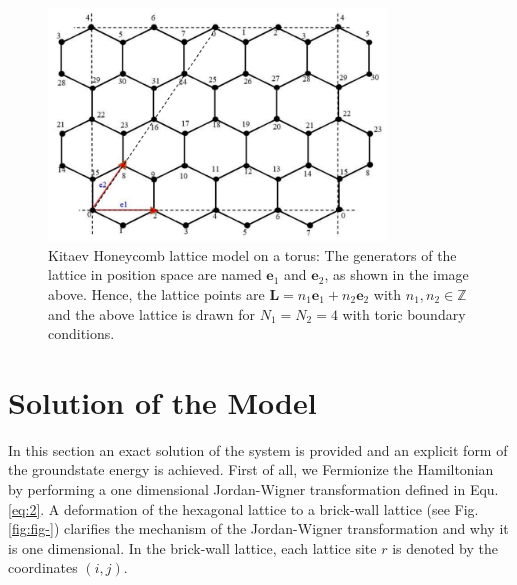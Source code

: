 \documentclass{article}
\begin{document}
\begin{figure}[h!]
	\centering
	\includegraphics[width=0.8\textwidth]{./images/diag_1.png}
	\caption{\label{tab:r_space} Kitaev Honeycomb lattice model on a torus: The generators of the lattice in position space are named
	$\textbf{e}_{1}$ and  $\textbf{e}_{2}$, as shown in the image above. Hence, the lattice points are $\textbf{L} = n_{1}\textbf{e}_{1} + 
	n_{2}\textbf{e}_{2}$ with $n_{1}, n_{2} \in \mathbb{Z}$ and the above lattice is drawn for $N_{1} = N_{2} = 4 $ with toric boundary conditions.} 
	\label{fig:fig1}
\end{figure}






\section{Solution of the Model}

In this section an exact solution of the system is provided and an explicit form of the groundstate energy is achieved. First of all, we Fermionize the Hamiltonian by performing a one dimensional Jordan-Wigner transformation \cite{nus-9-10} defined in Equ.\hspace{0.2mm}\ref{eq:2}. A deformation of the hexagonal lattice to a brick-wall lattice (see Fig.\hspace{0.2mm}\ref{fig:fig-}) clarifies the mechanism of the Jordan-Wigner transformation and why it is one dimensional. In the brick-wall lattice, each lattice site $r$ is denoted by the coordinates $(i,j)$.
\end{document}
